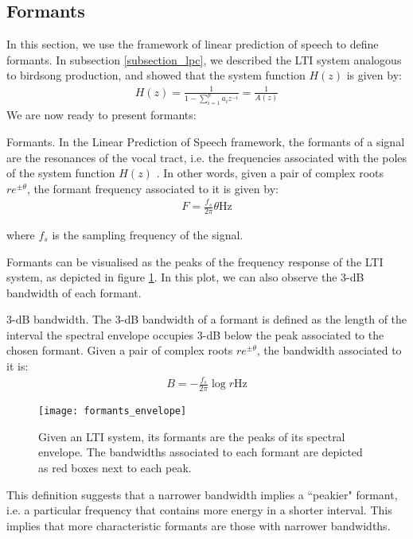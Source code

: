 \documentclass[../main.tex]{subfiles}
\begin{document}
\subsection{Formants} \label{subsection_fmnts}
\par In this section, we use the framework of linear prediction of speech to define formants. In subsection \ref{subsection_lpc}, we described the LTI system analogous to birdsong production, and showed that the system function $H(z)$ is given by:
\begin{align*}
H(z) = \frac{1}{1 - \sum_{i=1}^pa_iz^{-i}} = \frac{1}{A(z)}
\end{align*}
We are now ready to present formants:
\begin{definition}{Formants.} \label{def_formants}
In the Linear Prediction of Speech framework, the formants of a signal are the resonances of the vocal tract, i.e. the frequencies associated with the poles of the system function $H(z)$ \cite{Snell1993}. In other words, given a pair of complex roots $re^{\pm\theta}$, the formant frequency associated to it is given by:
\begin{align*}
F = \frac{f_s}{2\pi}\theta \text{Hz}
\end{align*}
\end{definition}
where $f_s$ is the sampling frequency of the signal. 
\par Formants can be visualised as the peaks of the frequency response of the LTI system, as depicted in figure \ref{fig_fmnts_lpc}. In this plot, we can also observe the 3-dB bandwidth of each formant. 
\begin{definition}{3-dB bandwidth.}\label{def_bandwidth}
The 3-dB bandwidth of a formant is defined as the length of the interval the spectral envelope occupies 3-dB below the peak associated to the chosen formant. Given a pair of complex roots $re^{\pm\theta}$, the bandwidth associated to it is:
\begin{align*}
B = -\frac{f_s}{2\pi}\log{r} \text{Hz}
\end{align*}
\end{definition}
\begin{figure}[t]
\centering
\texttt{[image: formants\_envelope]}
\caption{Given an LTI system, its formants are the peaks of its spectral envelope. The bandwidths associated to each formant are depicted as red boxes next to each peak.}
\label{fig_fmnts_lpc}
\end{figure}
\par This definition suggests that a narrower bandwidth implies a ``peakier" formant, i.e. a particular frequency that contains more energy in a shorter interval. This implies that more characteristic formants are those with narrower bandwidths.
\end{document}
